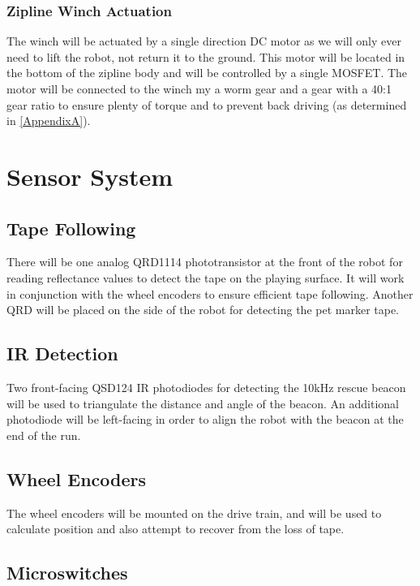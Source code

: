 \documentclass[11pt, oneside]{article} %
\begin{document}
		\subsubsection{Zipline Winch Actuation}
		The winch will be actuated by a single direction DC motor as we will only ever need to lift the robot, not return it to the ground. This motor will be located in the bottom of the zipline body and will be controlled by a single MOSFET. The motor will be connected to the winch my a worm gear and a gear with a 40:1 gear ratio to ensure plenty of torque and to prevent back driving (as determined in \autoref{AppendixA}).


\section{Sensor System}
	
	\subsection{Tape Following}
	
	There will be one analog QRD1114 phototransistor at the front of the robot for reading reflectance values to detect the tape on the playing surface. It will work in conjunction with the wheel encoders to ensure efficient tape following. Another QRD will be placed on the side of the robot for detecting the pet marker tape.
	
	\subsection{IR Detection}
	Two front-facing QSD124 IR photodiodes for detecting the 10kHz rescue beacon will be used to triangulate the distance and angle of the beacon. An additional photodiode will be left-facing in order to align the robot with the beacon at the end of the run.
	
	\subsection{Wheel Encoders}
	
	The wheel encoders will be mounted on the drive train, and will be used to calculate position and also attempt to recover from the loss of tape.
	
	\subsection{Microswitches}
	
\end{document}
